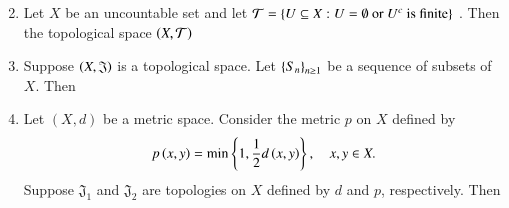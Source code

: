 \documentclass[journal]{IEEEtran}
\begin{document}
\begin{enumerate}
\begin{enumerate}
\begin{multicols}{2}
\end{multicols}
\end{enumerate}
\item Let $X$ be an uncountable set and let
$ \mathcal{T} = \left\{ U \subseteq X : U = \emptyset \text{ or } U^c \text{ is finite} \right\} $ . Then the topological space $\left(X, \mathcal{T}\right)$
\begin{enumerate}
\end{enumerate}
\item Suppose $\left(X, \mathfrak{J}\right)$ is a topological space. Let $\left\{S_n\right\}_{n \geq 1}$ be a sequence of subsets of $X$. Then
\begin{enumerate}
\end{enumerate}
\item Let $(X, d)$ be a metric space. Consider the metric $p$ on $X$ defined by $$p\left(x, y\right) = \min\left\{1, \frac{1}{2}d\left(x, y\right)\right\}, \quad x, y \in X.$$ Suppose $\mathfrak{J}_{1}$ and $\mathfrak{J}_{2}$ are topologies on $X$ defined by $d$ and $p$, respectively. Then
\begin{enumerate}

\end{enumerate}
\end{enumerate}
\end{document}
